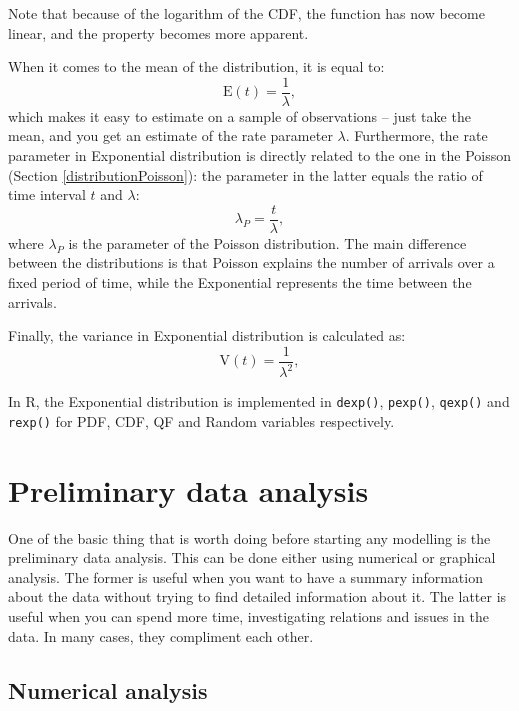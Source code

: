 \documentclass[
]{book}
\theoremstyle{definition}
\theoremstyle{definition}
\theoremstyle{definition}
\theoremstyle{definition}
\theoremstyle{remark}
\begin{document}
Note that because of the logarithm of the CDF, the function has now become linear, and the property becomes more apparent.

When it comes to the mean of the distribution, it is equal to:
\begin{equation}
    \mathrm{E}(t) = \frac{1}{\lambda},
    \label{eq:ExponentialMean}
\end{equation}
which makes it easy to estimate on a sample of observations -- just take the mean, and you get an estimate of the rate parameter \(\lambda\). Furthermore, the rate parameter in Exponential distribution is directly related to the one in the Poisson (Section \ref{distributionPoisson}): the parameter in the latter equals the ratio of time interval \(t\) and \(\lambda\):
\begin{equation}
    \lambda_P = \frac{t}{\lambda},
    \label{eq:ExponentialLambdaPoisson}
\end{equation}
where \(\lambda_P\) is the parameter of the Poisson distribution. The main difference between the distributions is that Poisson explains the number of arrivals over a fixed period of time, while the Exponential represents the time between the arrivals.

Finally, the variance in Exponential distribution is calculated as:
\begin{equation}
    \mathrm{V}(t) = \frac{1}{\lambda^2},
    \label{eq:ExponentialVariance}
\end{equation}

In R, the Exponential distribution is implemented in \texttt{dexp()}, \texttt{pexp()}, \texttt{qexp()} and \texttt{rexp()} for PDF, CDF, QF and Random variables respectively.

\chapter{Preliminary data analysis}\label{dataAnalysis}

One of the basic thing that is worth doing before starting any modelling is the preliminary data analysis. This can be done either using numerical or graphical analysis. The former is useful when you want to have a summary information about the data without trying to find detailed information about it. The latter is useful when you can spend more time, investigating relations and issues in the data. In many cases, they compliment each other.

\section{Numerical analysis}\label{dataAnalysisNumerical}
\end{document}
